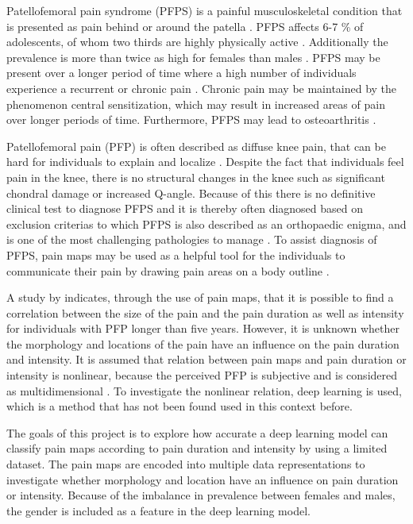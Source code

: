 Patellofemoral pain syndrome (PFPS) is a painful musculoskeletal condition that is presented as pain behind or around the patella \citep{Maclachlan2017, Smith2015}. PFPS affects 6-7 \% of adolescents, of whom two thirds are highly physically active \citep{Rathleff2015}. Additionally the prevalence is more than twice as high for females than males \citep{Rathleff2015, Petersen2013}.
PFPS may be present over a longer period of time where a high number of individuals experience a recurrent or chronic pain \citep{Witvrouw2014}. Chronic pain may be maintained by the phenomenon central sensitization, which may result in increased areas of pain over longer periods of time. Furthermore, PFPS may lead to osteoarthritis \citep{Petersen2013, Crossley2016}. 

\noindent
Patellofemoral pain (PFP) is often described as diffuse knee pain, that can be hard for individuals to explain and localize \citep{Witvrouw2014}. Despite the fact that individuals feel pain in the knee, there is no structural changes in the knee such as significant chondral damage or increased Q-angle. Because of this there is no definitive clinical test to diagnose PFPS and it is thereby often diagnosed based on exclusion criterias \citep{Petersen2013} to which PFPS is also described as an orthopaedic enigma, and is one of the most challenging pathologies to manage \citep{Dye2001}.
To assist diagnosis of PFPS, pain maps may be used as a helpful tool for the individuals to communicate their pain by drawing pain areas on a body outline \citep{Boudreau2016}.

\noindent
A study by \citeauthor{Boudreau2017} indicates, through the use of pain maps, that it is possible to find a correlation between the size of the pain and the pain duration as well as intensity for individuals with PFP longer than five years.\citep{Boudreau2017} However, it is unknown whether the morphology and locations of the pain have an influence on the pain duration and intensity.
It is assumed that relation between pain maps and pain duration or intensity is nonlinear, because the perceived PFP is subjective and is considered as multidimensional \citep{Dansie2013}. To investigate the nonlinear relation, deep learning is used, which is a method that has not been found used in this context before.

\noindent
The goals of this project is to explore how accurate a deep learning model can classify pain maps according to pain duration and intensity by using a limited dataset. The pain maps are encoded into multiple data representations to investigate whether morphology and location have an influence on pain duration or intensity. Because of the imbalance in prevalence between females and males, the gender is included as a feature in the deep learning model. \newline


